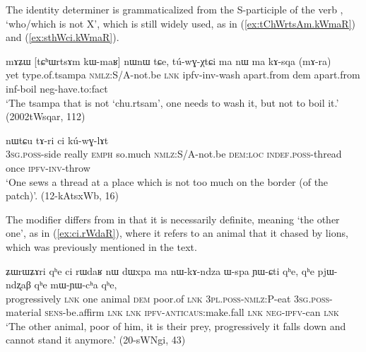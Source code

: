 The identity determiner  is grammaticalized from the S-participle of the verb ,  `who/which is not X', which is still widely used, as in (\ref{ex:tChWrtsAm.kWmaR}) and (\ref{ex:sthWci.kWmaR}).



\begin{exe}
\ex \label{ex:tChWrtsAm.kWmaR}
\gll mɤʑɯ [tɕʰɯrtsɤm kɯ-maʁ] nɯnɯ tɕe, tú-wɣ-χtɕi ma nɯ ma kɤ-sqa (mɤ-ra) \\
yet type.of.tsampa \textsc{nmlz}:S/A-not.be \textsc{lnk} ipfv-inv-wash apart.from dem apart.from inf-boil neg-have.to:fact \\
\glt `The tsampa that is not `chu.rtsam', one needs to wash it, but not to boil it.' (2002tWsqar, 112)
\end{exe}

\begin{exe}
\ex \label{ex:sthWci.kWmaR}
 nɯtɕu tɤ-ri ci kú-wɣ-lɤt \\
\textsc{3sg}.\textsc{poss}-side really \textsc{emph} so.much \textsc{nmlz}:S/A-not.be \textsc{dem}:\textsc{loc} \textsc{indef}.\textsc{poss}-thread once \textsc{ipfv}-\textsc{inv}-throw \\
\glt `One sews a thread at a place which is not too much on the border (of the patch)'. (12-kAtsxWb, 16)
\end{exe}

The modifier  differs from  in that it is necessarily definite, meaning `the other one', as in (\ref{ex:ci.rWdaR}), where it refers to an animal that it chased by lions, which was previously mentioned in the text.

\begin{exe}
\ex \label{ex:ci.rWdaR}
\gll ʑɯrɯʑɤri qʰe ci rɯdaʁ nɯ dɯxpa ma nɯ-kɤ-ndza ɯ-spa ɲɯ-ɕti qʰe, qʰe pjɯ-ndʐaβ qʰe mɯ-ɲɯ-cʰa qʰe, \\
progressively \textsc{lnk} one animal \textsc{dem} poor.of \textsc{lnk} \textsc{3pl}.\textsc{poss}-\textsc{nmlz}:P-eat \textsc{3sg}.\textsc{poss}-material \textsc{sens}-be.affirm \textsc{lnk} \textsc{lnk} \textsc{ipfv}-\textsc{anticaus}:make.fall \textsc{lnk} \textsc{neg}-\textsc{ipfv}-can \textsc{lnk} \\
\glt `The other animal, poor of him, it is their prey, progressively it falls down and cannot stand it anymore.' (20-sWNgi, 43)
\end{exe}

